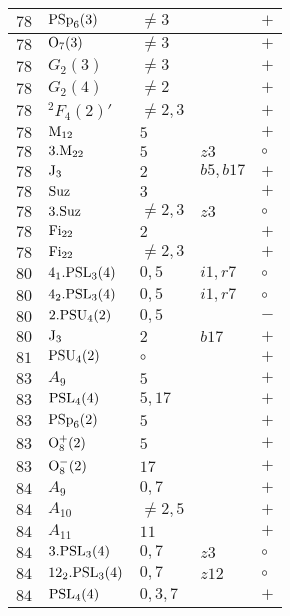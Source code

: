 \documentclass[a4paper, 11pt]{article}
\begin{document}
\begin{longtable}{lllll}
		$78$ & ${\rm PSp}_{6}(3)$ & $\neq 3$ &  & $+$ \\ \hline
		$78$ & ${\rm O}_{7}(3)$ & $\neq 3$ &  & $+$ \\ \hline
		$78$ & $G_{2}(3)$ & $\neq 3$ &  & $+$ \\ \hline
		$78$ & $G_{2}(4)$ & $\neq 2$ &  & $+$ \\ \hline
		$78$ & ${}^{2}F_{4}(2)'$ & $\neq 2,3$ &  & $+$ \\ \hline
		$78$ & ${\rm M}_{12}$ & $5$ &  & $+$ \\ \hline
		$78$ & $3.{\rm M}_{22}$ & $5$ & $z3$ & $\circ$ \\ \hline
		$78$ & ${\rm J}_3$ & $2$ & $b5, b17$ & $+$ \\ \hline
		$78$ & ${\rm Suz}$ & $3$ &  & $+$ \\ \hline
		$78$ & $3.{\rm Suz}$ & $\neq 2,3$ & $z3$ & $\circ$ \\ \hline
		$78$ & ${\rm Fi}_{22}$ & $2$ &  & $+$ \\ \hline
		$78$ & ${\rm Fi}_{22}$ & $\neq 2,3$ &  & $+$ \\ \hline
		$80$ & $4_1.{\rm PSL}_{3}(4)$ & $0,5$ & $i1, r7$ & $\circ$ \\ \hline
		$80$ & $4_2.{\rm PSL}_{3}(4)$ & $0,5$ & $i1, r7$ & $\circ$ \\ \hline
		$80$ & $2.{\rm PSU}_{4}(2)$ & $0,5$ &  & $-$ \\ \hline
		$80$ & ${\rm J}_3$ & $2$ & $b17$ & $+$ \\ \hline
		$81$ & ${\rm PSU}_{4}(2)$ & $\circ$ &  & $+$ \\ \hline
		$83$ & $A_{9}$ & $5$ &  & $+$ \\ \hline
		$83$ & ${\rm PSL}_{4}(4)$ & $5,17$ &  & $+$ \\ \hline
		$83$ & ${\rm PSp}_{6}(2)$ & $5$ &  & $+$ \\ \hline
		$83$ & ${\rm O}_{8}^+(2)$ & $5$ &  & $+$ \\ \hline
		$83$ & ${\rm O}_{8}^-(2)$ & $17$ &  & $+$ \\ \hline
		$84$ & $A_{9}$ & $0,7$ &  & $+$ \\ \hline
		$84$ & $A_{10}$ & $\neq 2,5$ &  & $+$ \\ \hline
		$84$ & $A_{11}$ & $11$ &  & $+$ \\ \hline
		$84$ & $3.{\rm PSL}_{3}(4)$ & $0,7$ & $z3$ & $\circ$ \\ \hline
		$84$ & $12_2.{\rm PSL}_{3}(4)$ & $0,7$ & $z12$ & $\circ$ \\ \hline
		$84$ & ${\rm PSL}_{4}(4)$ & $0,3,7$ &  & $+$ \\ \hline

\end{longtable}
\end{document}
